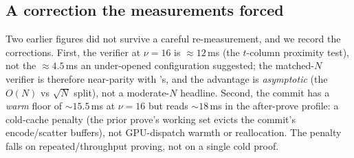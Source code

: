 \subsection{A correction the measurements forced}
\label{sec:res-commit}

Two earlier figures did not survive a careful re-measurement, and we record the
corrections. First, the \zinc{} verifier at $\nu{=}16$ is $\approx 12$\,ms (the
$t$-column proximity test), not the $\approx 4.5$\,ms an under-opened
configuration suggested; the matched-$N$ verifier is therefore near-parity with
\binius{}'s, and the \zinc{} advantage is \emph{asymptotic} (the $O(N)$ vs
$\sqrt N$ split), not a moderate-$N$ headline. Second, the \zinc{} commit has a
\emph{warm} floor of $\sim$$15.5$\,ms at $\nu{=}16$ but reads $\sim$$18$\,ms in
the after-prove profile: a cold-cache penalty (the prior prove's working set
evicts the commit's encode/scatter buffers), not GPU-dispatch warmth or
reallocation. The penalty falls on repeated/throughput proving, not on a single
cold proof.
